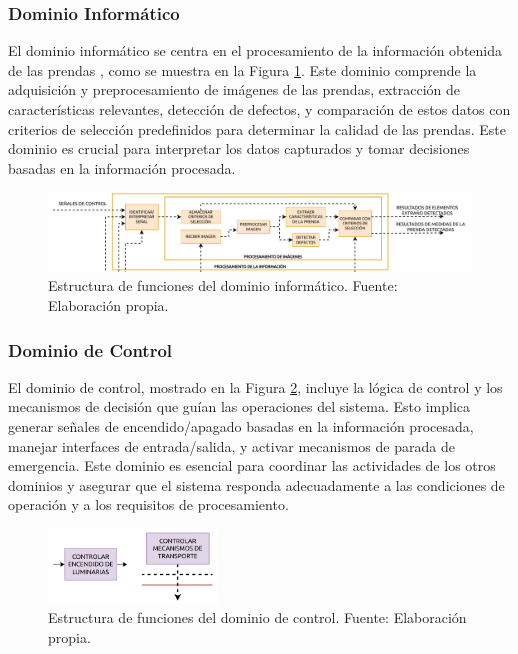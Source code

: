 \subsubsection{Dominio Informático}

El dominio informático se centra en el procesamiento de la información obtenida de las prendas , como se muestra en la Figura \ref{fig:EF_DIn}. Este dominio comprende la adquisición y preprocesamiento de imágenes de las prendas, extracción de características relevantes, detección de defectos, y comparación de estos datos con criterios de selección predefinidos para determinar la calidad de las prendas. Este dominio es crucial para interpretar los datos capturados y tomar decisiones basadas en la información procesada.

\begin{figure}[h]
	\centering
	\includegraphics[width=\textwidth]{img/EF_DIn.pdf}
	\caption[Estructura de funciones del dominio informático.]{Estructura de funciones del dominio informático. Fuente: Elaboración propia.}
	\label{fig:EF_DIn}
\end{figure}

\subsubsection{Dominio de Control}

El dominio de control, mostrado en la Figura \ref{fig:EF_DC}, incluye la lógica de control y los mecanismos de decisión que guían las operaciones del sistema. Esto implica generar señales de encendido/apagado basadas en la información procesada, manejar interfaces de entrada/salida, y activar mecanismos de parada de emergencia. Este dominio es esencial para coordinar las actividades de los otros dominios y asegurar que el sistema responda adecuadamente a las condiciones de operación y a los requisitos de procesamiento.

\begin{figure}[h]
	\centering
	\includegraphics[width=0.4\textwidth]{img/EF_DC.pdf}
	\caption[Estructura de funciones del dominio de control.]{Estructura de funciones del dominio de control. Fuente: Elaboración propia.}
	\label{fig:EF_DC}
\end{figure}

